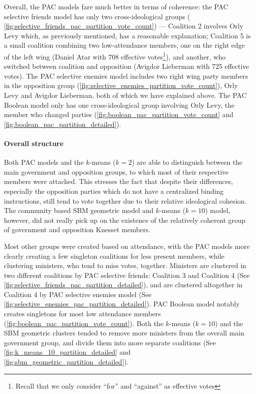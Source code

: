 Overall, the PAC models fare much better in terms of coherence:
the PAC selective friends model has only two cross-ideological groups (
\autoref{fig:selective_friends_pac_partition_vote_count}) ---
Coalition 2 involves Orly Levy which, as previously mentioned, has a reasonable
explanation; Coalition 5 is a small coalition combining two low-attendance
members, one on the right edge of the left wing (Daniel Atar with 708 effective
votes\footnote{Recall that we only consider ``for'' and ``against'' as
effective votes}), and another, who switched between coalition and opposition
\cite{knesset:lieberman, wiki:lieberman} (Avigdor Lieberman with 725 effective
votes).
The PAC selective enemies model includes two right wing party members in the
opposition group (\autoref{fig:selective_enemies_partition_vote_count}),
Orly Levy and Avigdor Lieberman, both of which we have explained above.
The PAC Boolean model only has one cross-ideological group involving Orly Levy,
the member who changed parties (\autoref{fig:boolean_pac_partition_vote_count}
and \autoref{fig:boolean_pac_partition_detailed}).

\paragraph{Overall structure}
Both PAC models and the $k$-means ($k=2$) are able to distinguish between the
main government and opposition groups, to which most of their respective
members were attached.
This stresses the fact that despite their differences, especially the opposition
parties which do not have a centralized binding instructions, still tend to
vote together due to their relative ideological cohesion.
The community based SBM geometric model and $k$-means ($k=10$) model, however,
did not really pick up on the existence of the relatively coherent group of
government and opposition Knesset members.

Most other groups were created based on attendance, with the PAC models more
clearly creating a few singleton coalitions for less present members, while
clustering ministers, who tend to miss votes, together.
Ministers are clustered in two different coalitions by PAC selective friends:
Coalition 3 and Coalition 4
(See \autoref{fig:selective_friends_pac_partition_detailed}), and are clustered
altogether in Coalition 4 by PAC selective enemies model (See
\autoref{fig:selective_enemies_pac_partition_detailed}).
PAC Boolean model notably creates singletons for most low attendance members
(\autoref{fig:boolean_pac_partition_vote_count}).
Both the $k$-means ($k=10$) and the SBM geometric clusters tended to remove
more ministers from the overall main government group, and divide them into
more separate coalitions (See \autoref{fig:k_means_10_partition_detailed} and 
\autoref{fig:sbm_geometric_partition_detailed}).

